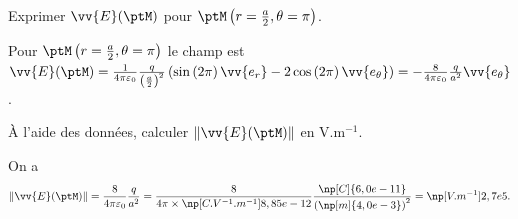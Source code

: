 \begin{enonce}
	Exprimer $\vv{E}(\ptM)$ pour $\ptM\left(r=\frac{a}{2},\theta=\pi\right)$.
\end{enonce}


\begin{corrige}
	Pour $\ptM\left(r=\frac{a}{2},\theta=\pi\right)$ le champ est
	$
		\vv{E}(\ptM) = \frac{1}{4\pi\varepsilon_0} \frac{q}{\left(\frac{a}{2}\right)^2} \left( \sin\left( 2\pi\right) \vv{e_{r}} -  2\cos\left( 2\pi\right) \vv{e_{\theta}} \right) = -\frac{8}{4\pi\varepsilon_0} \frac{q}{a^2} \vv{e_{\theta}}
	$.
\end{corrige}





\begin{enonce}
	À l'aide des données, calculer $\| \vv{E}(\ptM) \|$ en V.m$^{-1}$.
\end{enonce}


\begin{corrige}
On a
	\[
		\| \vv{E}(\ptM) \| = \frac{8}{4\pi\varepsilon_0} \frac{q}{a^2} = \frac{8}{ 4\pi \times \np[C.V^{-1}.m^{-1}]{8,85e-12} } \frac{\np[C]{6,0e-11}}{\left(\np[m]{4,0e-3}\right)^2} = \np[V.m^{-1}]{2,7e5}.
	\]
\end{corrige}


\finEntrainement







\hauteurLargeurCadreReponse		{7mm}{7cm}
\initialisationEntrainement

